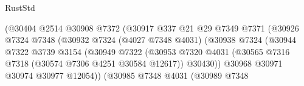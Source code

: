 \begin{lexlean}{RustStd}
\begin{coremodule}
                                              (@30404
                                                @2514
                                                @30908
                                                @7372
                                                (@30917
                                                  @337
                                                  @21
                                                  @29
                                                  @7349
                                                  @7371
                                                  (@30926
                                                    @7324
                                                    @7348
                                                    (@30932
                                                      @7324
                                                      (@4027 @7348 @4031)
                                                      (@30938
                                                        @7324
                                                        (@30944
                                                          @7322
                                                          @3739
                                                          @3154
                                                          (@30949
                                                            @7322
                                                            (@30953
                                                              @7320
                                                              @4031
                                                              (@30565
                                                                @7316
                                                                @7318
                                                                (@30574 @7306 @4251 @30584 @12617))
                                                              @30430))
                                                          @30968
                                                          @30971
                                                          @30974
                                                          @30977
                                                          @12054))
                                                      (@30985
                                                        @7348
                                                        @4031
                                                        (@30989
                                                          @7348

\end{coremodule}
\end{lexlean}
